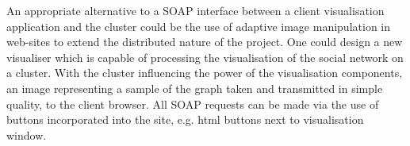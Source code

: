 An appropriate alternative to a SOAP interface between a client visualisation application and the cluster could be the use of adaptive image manipulation in web-sites to extend the distributed nature of the project. One could design a new visualiser which is capable of processing the visualisation of the social network on a cluster. With the cluster influencing the power of the visualisation components, an image representing a sample of the graph taken and transmitted in simple quality, to the client browser. All SOAP requests can be made via the use of buttons incorporated into the site, e.g. html buttons next to visualisation window. 


